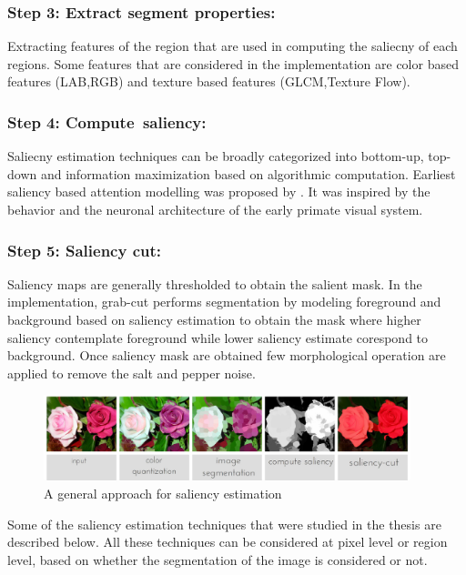 \subsubsection{Step 3: Extract segment properties:} Extracting features of the region that are used in computing the saliecny of each regions. Some features that are considered in the implementation are color based features (LAB,RGB) and texture based features (GLCM,Texture Flow).

\subsubsection{Step 4: Compute~saliency:} Saliecny estimation techniques can be broadly categorized into bottom-up, top-down and information maximization based on algorithmic computation. Earliest saliency based attention modelling was proposed by \cite{itti}. It was inspired by the behavior and the neuronal architecture of the early primate visual system.

\subsubsection{Step 5: Saliency cut:} Saliency maps are generally thresholded to obtain the salient mask. In the implementation, grab-cut\citep{grabcut} performs segmentation by modeling foreground and background based on saliency estimation to obtain the mask where higher saliency  contemplate foreground while lower saliency estimate corespond to background. Once saliency mask are obtained few morphological operation are applied to remove the salt and pepper noise.

\begin{figure}[htpb]
   \begin{center}
	    \includegraphics[width=0.95\textwidth]{snaps/sal/saliency.eps}     
     \caption {A general approach for saliency estimation}
   \label{fig:bgsub}
   \end{center}
 \end{figure}

\par Some of the saliency estimation techniques that were studied in the thesis are described below. All these techniques can be considered at pixel level or region level, based on whether the segmentation of the image is considered or not.

